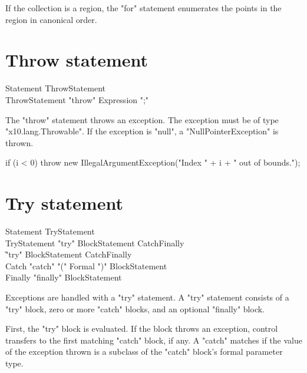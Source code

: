 If the collection is a region, the \xcd"for" statement
enumerates the points in the region in canonical order.




\section{Throw statement}

\begin{grammar}
Statement \: ThrowStatement \\
ThrowStatement \: \xcd"throw" Expression \xcd";"
\end{grammar}

The \xcd"throw" statement throws an exception.  The exception
must be of type \xcd"x10.lang.Throwable".  If the exception is
\xcd"null", a \xcd"NullPointerException" is thrown.

\begin{example}
\begin{xten}
if (i < 0) 
    throw new IllegalArgumentException("Index " + i + " out of bounds.");
\end{xten}
\end{example}

\section{Try statement}

\begin{grammar}
Statement \: TryStatement \\
TryStatement \: \xcd"try" BlockStatement Catch\plus Finally\opt \\
             \| \xcd"try" BlockStatement Catch\star Finally \\
Catch \: \xcd"catch" \xcd"(" Formal \xcd")" BlockStatement \\
Finally \: \xcd"finally" BlockStatement \\
\end{grammar}

Exceptions are handled with a \xcd"try" statement.
A \xcd"try" statement consists of a \xcd"try" block, zero or more
\xcd"catch" blocks, and an optional \xcd"finally" block.

First, the \xcd"try" block is evaluated.  If the block throws an
exception, control transfers to the first matching \xcd"catch"
block, if any.  A \xcd"catch" matches if the value of the
exception thrown is a subclass of the \xcd"catch" block's formal
parameter type.


